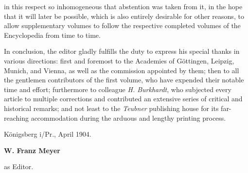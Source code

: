 \thispagestyle{fancy}

\vspace{0.5cm}

in this respect so inhomogeneous that abstention was taken from it, in the hope that it will later be possible, which is also entirely desirable for other reasons, to allow supplementary volumes to follow the respective completed volumes of the Encyclopedia from time to time.

In conclusion, the editor gladly fulfills the duty to express his special thanks in various directions: first and foremost to the Academies of Göttingen, Leipzig, Munich, and Vienna, as well as the commission appointed by them; then to all the gentlemen contributors of the first volume, who have expended their notable time and effort; furthermore to colleague \textit{H. Burkhardt}, who subjected every article to multiple corrections and contributed an extensive series of critical and historical remarks; and not least to the \textit{Teubner} publishing house for its far-reaching accommodation during the arduous and lengthy printing process.

\vspace{1cm}
Königsberg i/Pr., April 1904.

\vspace{0.5cm}

\begin{minipage}{1.65\textwidth}
\begin{flushright}
\centering
\textbf{W. Franz Meyer}

as Editor.
\end{flushright}
\end{minipage}

